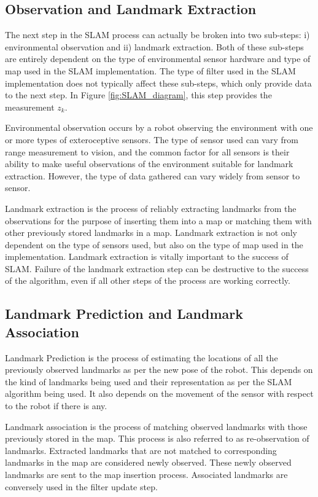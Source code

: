 \subsection{Observation and Landmark Extraction}

The next step in the SLAM process can actually be broken into two sub-steps: i) environmental observation and ii) landmark extraction. Both of these sub-steps are entirely dependent on the type of environmental sensor hardware and type of map used in the SLAM implementation. The type of filter used in the SLAM implementation does not typically affect these sub-steps, which only provide data to the next step. In Figure \ref{fig:SLAM_diagram}, this step provides the measurement $ z_k $.

Environmental observation occurs by a robot observing the environment with one or more types of exteroceptive sensors. The type of sensor used can vary from range measurement to vision, and the common factor for all sensors is their ability to make useful observations of the environment suitable for landmark extraction. However, the type of data gathered can vary widely from sensor to sensor.

Landmark extraction is the process of reliably extracting landmarks from the observations for the purpose of inserting them into a map or matching them with other previously stored landmarks in a map. Landmark extraction is not only dependent on the type of sensors used, but also on the type of map used in the implementation. Landmark extraction is vitally important to the success of SLAM. Failure of the landmark extraction step can be destructive to the success of the algorithm, even if all other steps of the process are working correctly. 

\subsection{Landmark Prediction and Landmark Association}

Landmark Prediction is the process of estimating the locations of all the previously observed landmarks as per the new pose of the robot. This depends on the kind of landmarks being used and their representation as per the SLAM algorithm being used. It also depends on the movement of the sensor with respect to the robot if there is any.

Landmark association is the process of matching observed landmarks with those previously stored in the map. This process is also referred to as re-observation of landmarks. Extracted landmarks that are not matched to corresponding landmarks in the map are considered newly observed. These newly observed landmarks are sent to the map insertion process. Associated landmarks are conversely used in the filter update step. 

